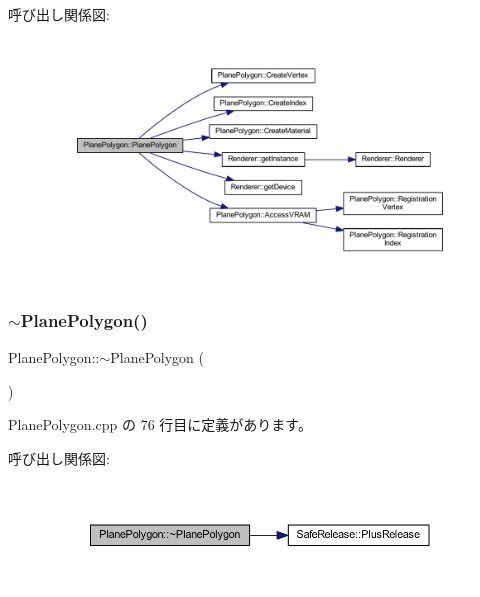 呼び出し関係図\+:
\nopagebreak
\begin{figure}[H]
\begin{center}
\leavevmode
\includegraphics[width=350pt]{class_plane_polygon_a27987c23a242840b142e0fa11650daf6_cgraph}
\end{center}
\end{figure}
\mbox{\label{class_plane_polygon_ac91d7ac1ceb00239f54b543690a78dab}} 
\subsubsection{\texorpdfstring{$\sim$\+Plane\+Polygon()}{~PlanePolygon()}}
{\footnotesize\ttfamily Plane\+Polygon\+::$\sim$\+Plane\+Polygon (\begin{DoxyParamCaption}{ }\end{DoxyParamCaption})\hspace{0.3cm}{\ttfamily [virtual]}}



 Plane\+Polygon.\+cpp の 76 行目に定義があります。

呼び出し関係図\+:\nopagebreak
\begin{figure}[H]
\begin{center}
\leavevmode
\includegraphics[width=350pt]{class_plane_polygon_ac91d7ac1ceb00239f54b543690a78dab_cgraph}
\end{center}
\end{figure}


